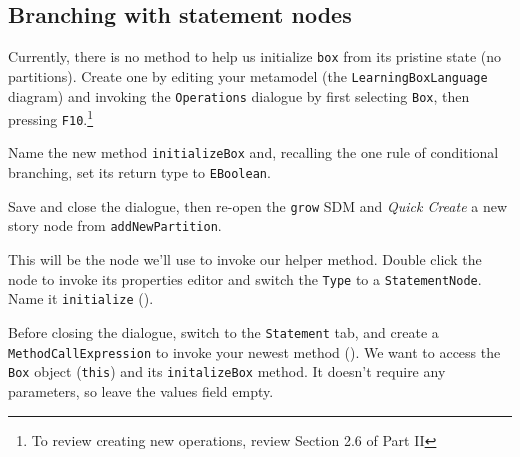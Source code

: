 \clearpage
\hypertarget{conBran vis}{}
\subsection{Branching with statement nodes}
\genHeader

\begin{stepbystep}

\item Currently, there is no method to help us initialize \texttt{box} from its pristine state (no partitions). Create one by editing
your metamodel (the \texttt{LearningBoxLanguage} diagram) and invoking the \texttt{Operations} dialogue by first selecting \texttt{Box}, then pressing
\texttt{F10}.\footnote{To review creating new operations, review Section 2.6 of Part II}

\item Name the new method \texttt{initializeBox} and, recalling the one rule of conditional branching, set its return type to
\texttt{EBoolean}.

\item Save and close the dialogue, then re-open the \texttt{grow} SDM and \emph{Quick Create} a new story node from
\texttt{addNewPartition}.

\item This will be the node we'll use to invoke our helper method. Double click the node to invoke its properties editor and switch the
\texttt{Type} to a \texttt{StatementNode}. Name it \texttt{initialize} ().

\item Before closing the dialogue, switch to the \texttt{Statement} tab, and create a \texttt{MethodCallExpression} to invoke your newest
method (). We want to access the \texttt{Box} object (\texttt{this}) and its \texttt{initalizeBox} method. It doesn't require any
parameters, so leave the values field empty. 

\begin{figure}[htbp]
   \centering
      \caption{}
\end{figure}
\FloatBarrier

\clearpage


\end{stepbystep}
